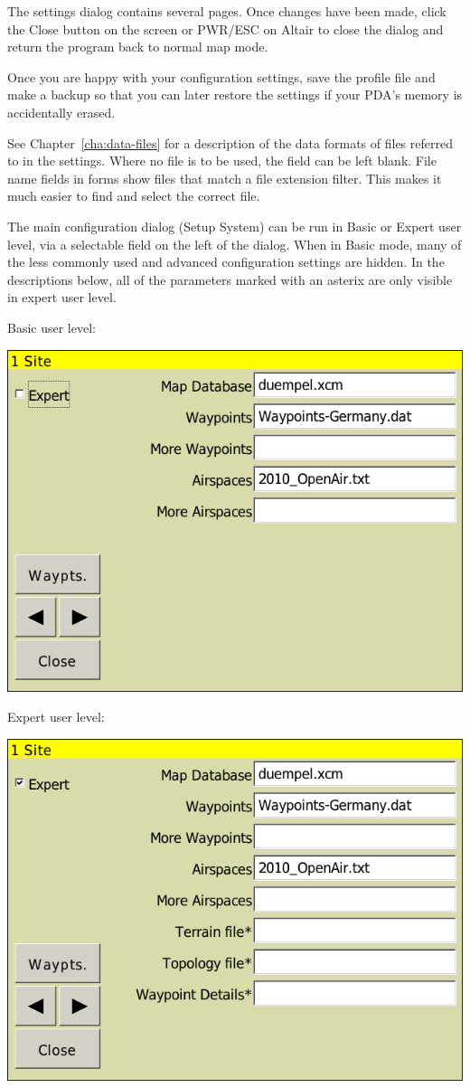 The settings dialog contains several pages.  Once changes have been made,
click the Close button on the screen or PWR/ESC on Altair to close the dialog
and return the program back to normal map mode.

\tip Once you are happy with your configuration settings, save the
profile file and make a backup so that you can later restore the
settings if your PDA's memory is accidentally erased.

See Chapter~\ref{cha:data-files} for a description of the data formats
of files referred to in the settings.  Where no file is to be used,
the field can be left blank.  File name fields in forms show files
that match a file extension filter.  This makes it much easier to find
and select the correct file.

The main configuration dialog (Setup System) can be run in Basic or
Expert user level, via a selectable field on the left of the dialog.
When in Basic mode, many of the less commonly used and advanced
configuration settings are hidden.  In the descriptions below,
all of the parameters marked with an asterix are only visible in
expert user level.

Basic user level:
\begin{center}
\includegraphics[angle=0,width=0.8\linewidth,keepaspectratio='true']{figures/config-basic.png}
\end{center}

Expert user level:
\begin{center}
\includegraphics[angle=0,width=0.8\linewidth,keepaspectratio='true']{figures/config-expert.png}
\end{center}


